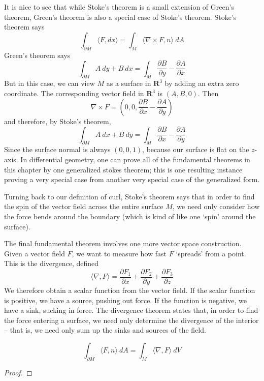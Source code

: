 It is nice to see that while Stoke's theorem is a small extension of Green's theorem, Green's theorem is also a special case of Stoke's theorem. Stoke's theorem says
%
\[ \int_{\partial M} \langle F, dx \rangle = \int_M \langle \nabla \times F, n \rangle\ dA \]
%
Green's theorem says
%
\[ \int_{\partial M} A\ dy + B\ dx = \int_M \frac{\partial B}{\partial y} - \frac{\partial A}{\partial x} \]
%
But in this case, we can view $M$ as a surface in $\mathbf{R}^3$ by adding an extra zero coordinate. The corresponding vector field in $\mathbf{R}^3$ is $(A,B,0)$. Then
%
\[ \nabla \times F = (0,0,\frac{\partial B}{\partial x} - \frac{\partial A}{\partial y}) \]
%
and therefore, by Stoke's theorem,
%
\[ \int_{\partial M} A\ dx + B\ dy = \int_M \frac{\partial B}{\partial x} - \frac{\partial A}{\partial y} \]
%
Since the surface normal is always $(0,0,1)$, because our surface is flat on the $z$-axis. In differential geometry, one can prove all of the fundamental theorems in this chapter by one generalized stokes theorem; this is one resulting instance proving a very special case from another very special case of the generalized form.

Turning back to our definition of curl, Stoke's theorem says that in order to find the spin of the vector field across the entire surface $M$, we need only consider how the force bends around the boundary (which is kind of like one `spin' around the surface).

The final fundamental theorem involves one more vector space construction. Given a vector field $F$, we want to measure how fast $F$ `spreads' from a point. This is the divergence, defined
%
\[ \langle \nabla, F \rangle = \frac{\partial F_1}{\partial x} + \frac{\partial F_2}{\partial y} + \frac{\partial F_3}{\partial z} \]
%
We therefore obtain a scalar function from the vector field. If the scalar function is positive, we have a source, pushing out force. If the function is negative, we have a sink, sucking in force. The divergence theorem states that, in order to find the force entering a surface, we need only determine the divergence of the interior -- that is, we need only sum up the sinks and sources of the field.

\begin{theorem}
    \[ \int_{\partial M} \langle F, n \rangle\ dA = \int_M \langle \nabla, F \rangle\ dV \]
\end{theorem}
\begin{proof}
\end{proof}

